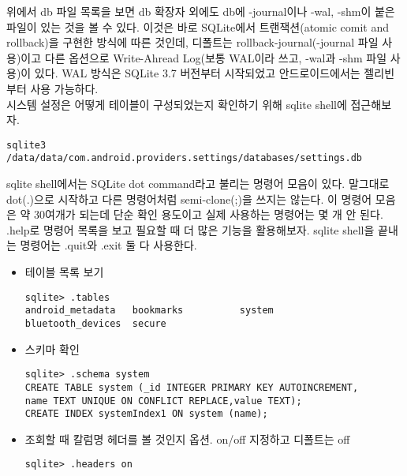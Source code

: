 위에서 db 파일 목록을 보면 db 확장자 외에도 db에 -journal이나 -wal, -shm이 붙은 파일이 있는 것을 볼 수 있다.
이것은 바로 SQLite에서 트랜잭션(atomic comit and rollback)을 구현한 방식에 따른 것인데, 디폴트는 rollback-journal(-journal 파일 사용)이고 다른 옵션으로 Write-Ahread Log(보통 WAL이라 쓰고, -wal과 -shm 파일 사용)이 있다.
WAL 방식은 SQLite 3.7 버전부터 시작되었고 안드로이드에서는 젤리빈부터 사용 가능하다.\\ 

시스템 설정은 어떻게 테이블이 구성되었는지 확인하기 위해 sqlite shell에 접근해보자.
\begin{lstlisting}[frame=single] 
sqlite3 /data/data/com.android.providers.settings/databases/settings.db
\end{lstlisting}

sqlite shell에서는 SQLite dot command라고 불리는 명령어 모음이 있다.
말그대로 dot(.)으로 시작하고 다른 명령어처럼 semi-clone(;)을 쓰지는 않는다. 이 명령어 모음은 약 30여개가 되는데 단순 확인 용도이고 실제 사용하는 명령어는 몇 개 안 된다.
.help로 명령어 목록을 보고 필요할 때 더 많은 기능을 활용해보자.
sqlite shell을 끝내는 명령어는 .quit와 .exit 둘 다 사용한다.
\begin{itemize}
\item 테이블 목록 보기
\begin{verbatim}
sqlite> .tables       
android_metadata   bookmarks          system           
bluetooth_devices  secure       
\end{verbatim}
\item 스키마 확인
\begin{verbatim}
sqlite> .schema system
CREATE TABLE system (_id INTEGER PRIMARY KEY AUTOINCREMENT,
name TEXT UNIQUE ON CONFLICT REPLACE,value TEXT);
CREATE INDEX systemIndex1 ON system (name);
\end{verbatim}
\item 조회할 때 칼럼명 헤더를 볼 것인지 옵션. on/off 지정하고 디폴트는 off
\begin{verbatim}
sqlite> .headers on 
\end{verbatim}
\end{itemize}

